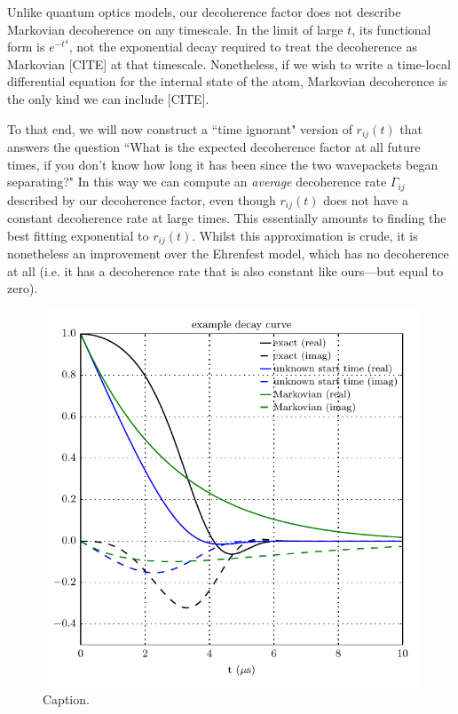 Unlike quantum optics models, our decoherence factor does not describe Markovian decoherence on any timescale. In the limit of large $t$, its functional form is $e^{-t^4}$, not the exponential decay required to treat the decoherence as Markovian [CITE] at that timescale. Nonetheless, if we wish to write a time-local differential equation for the internal state of the atom, Markovian decoherence is the only kind we can include [CITE].

To that end, we will now construct a ``time ignorant" version of $r_{ij}(t)$ that answers the question ``What is the expected decoherence factor at all future times, if you don't know how long it has been since the two wavepackets began separating?" In this way we can compute an \emph{average} decoherence rate $\Gamma_{ij}$ described by our decoherence factor, even though $r_{ij}(t)$ does not have a constant decoherence rate at large times. This essentially amounts to finding the best fitting exponential to $r_{ij}(t)$. Whilst this approximation is crude, it is nonetheless an improvement over the Ehrenfest model, which has no decoherence at all (i.e. it has a decoherence rate that is also constant like ours---but equal to zero).

\begin{figure}[t]
    \centerfloat
    \includegraphics{figures/hidden_variables/decoherence_factor_example.pdf}
    \caption{Caption.}
    \label{fig:decoherence_factor_example}
\end{figure}

